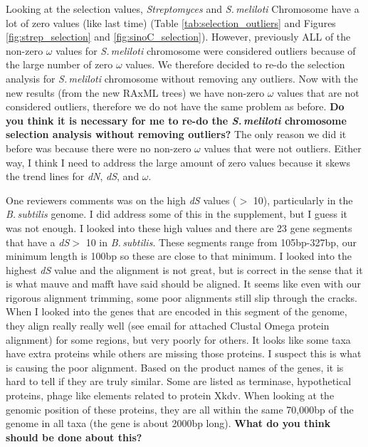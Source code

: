 \documentclass[12pt]{article}
\newcommand{\smel}{\textit{S.\,meliloti}\xspace}
\newcommand{\strep}{\textit{Streptomyces}\xspace}
\newcommand{\bass}{\textit{B.\,subtilis}\xspace}
\newcommand{\dn}{\textit{dN}\xspace}
\newcommand{\ds}{\textit{dS}\xspace}
\begin{document}
Looking at the selection values, \strep and \smel Chromosome have a lot of zero values (like last time) (Table \ref{tab:selection_outliers} and Figures \ref{fig:strep_selection} and \ref{fig:sinoC_selection}).
However, previously ALL of the non-zero $\omega$ values for \smel chromosome were considered outliers because of the large number of zero $\omega$ values.
We therefore decided to re-do the selection analysis for \smel chromosome without removing any outliers.
Now with the new results (from the new RAxML trees) we have non-zero $\omega$ values that are not considered outliers, therefore we do not have the same problem as before.
\textbf{Do you think it is necessary for me to re-do the \smel chromosome selection analysis without removing outliers?} The only reason we did it before was because there were no non-zero $\omega$ values that were not outliers.
Either way, I think I need to address the large amount of zero values because it skews the trend lines for \dn, \ds, and $\omega$.


One reviewers comments was on the high \ds values ($>$ 10), particularly in the \bass genome.
I did address some of this in the supplement, but I guess it was not enough.
I looked into these high values and there are 23 gene segments that have a \ds $>$ 10 in \bass.
These segments range from 105bp-327bp, our minimum length is 100bp so these are close to that minimum.
I looked into the highest \ds value and the alignment is not great, but is correct in the sense that it is what mauve and mafft have said should be aligned.
It seems like even with our rigorous alignment trimming, some poor alignments still slip through the cracks.
When I looked into the genes that are encoded in this segment of the genome, they align really really well (see email for attached Clustal Omega protein alignment) for some regions, but very poorly for others.
It looks like some taxa have extra proteins while others are missing those proteins.
I suspect this is what is causing the poor alignment.
Based on the product names of the genes, it is hard to tell if they are truly similar.
Some are listed as terminase, hypothetical proteins, phage like elements related to protein Xkdv.
When looking at the genomic position of these proteins, they are all within the same 70,000bp of the genome in all taxa (the gene is about 2000bp long).
\textbf{What do you think should be done about this?}
\end{document}
